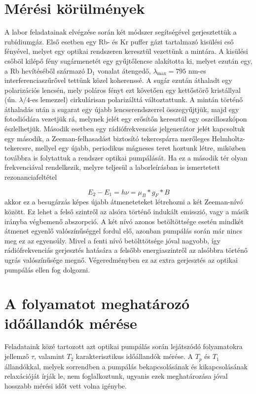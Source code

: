 \begin{multicols}{2}
\section{Mérési körülmények}
A labor feladatainak elvégzése során két módszer segítségével gerjesztettük a rubídiumgáz. Első esetben egy Rb- és Kr puffer gázt tartalmazó kisülési cső fényével, melyet egy optikai rendszeren keresztül vezettünk a mintára. A kisülési csőböl kilépő fény sugármenetét egy gyűjtőlencse alakította ki, melyet ezután egy, a Rb hevítéséből származó D$_{1}$ vonalat átengedő, $\lambda_{\text{max}} = 795$ nm-es interferenciaszűrővel tettünk közel koherenssé. A sugár ezután áthaladt egy polarizációs lencsén, mely poláros fényt ezt követően egy kettőstörő kristállyal (ún. $\lambda/4$-es lemezzel) cirkulárisan polarizálttá változtattunk. A mintán történő áthaladás után a sugarat egy újabb lencserendszerrel összegyűjtjük, majd egy fotodiódára vezetjük rá, melynek jelét egy erősítőn keresztül egy oszcilloszkópon észlelhetjük. \newline
Második esetben egy rádiófrekvenciás jelgenerátor jelét kapcsoltuk egy második, a Zeeman-felhasadást biztosító tekercspárra merőleges Helmholtz-tekercsre, mellyel egy újabb, periodikus mágneses teret hoztunk létre, miközben továbbra is folytattuk a rendszer optikai pumpálását. Ha ez a második tér olyan frekvenciával rendelkezik, melyre teljesül a laborleírásban is ismertetett rezonanciafeltétel

\begin{equation} \label{eq:1}
E_{2} - E_{1}
=
h \nu
=
\mu_{B} * g_{F} * B
\end{equation}
akkor ez a besugárzás képes újabb átmeneteteket létrehozni a két Zeeman-nívó között. Ez lehet a felső szintről az alsóra történő indukált emisszió, vagy a másik irányba végbemenő abszorpció. A két nívó azonos betöltöttsége esetén mindkét átmenet egyenlő valószínűséggel fordul elő, azonban pumpálás során már nincs meg ez az egyensúly. Mivel a fenti nívó betölttötsége jóval nagyobb, így rádiófrekvenciás gerjesztés hatására a felsőbb energiaszintről az alsóbbra történő ugrás valószínűsége megnő. Végeredményben ez az extra gerjesztés az optikai pumpálás ellen fog dolgozni.

\section{A folyamatot meghatározó időállandók mérése}
Feladataink közé tartozott azt optikai pumpálás során lejátszódó folyamatokra jellemző $\tau$, valamint $T_{2}$ karakterisztikus időállandók mérése. A $T_{p}$ és $T_{1}$ állandókkal, melyek sorrendben a pumpálás bekapcsolásának és kikapcsolásának relaxációját írják le, nem foglalkoztunk, ugyanis ezek meghatározása jóval hosszabb mérési időt vett volna igénybe.

\end{multicols}
